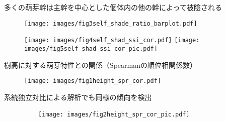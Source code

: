 \documentclass[a0, 36pt, plainboxedsections]{sciposter} %
\renewcommand{\baselinestretch}{1.2}
\begin{document}
\begin{multicols}{2}
多くの萌芽幹は主幹を中心とした個体内の他の幹によって被陰される

\begin{figure}
	\centering
		\texttt{[image: images/fig3self\_shade\_ratio\_barplot.pdf]}
				
		\texttt{[image: images/fig4self\_shad\_ssi\_cor.pdf]}
		\texttt{[image: images/fig5self\_shad\_ssi\_cor\_pic.pdf]}
\end{figure}

\columnbreak
\renewcommand{\baselinestretch}{0.8}
\begin{mdframed}[style=subsection.frame]
  \huge\textbf{}
\end{mdframed}
\renewcommand{\baselinestretch}{1.2} %

樹高に対する萌芽特性との関係（Spearmanの順位相関係数）

\begin{figure}
	\centering
		\texttt{[image: images/fig1height\_spr\_cor.pdf]}
\end{figure}

系統独立対比による解析でも同様の傾向を検出

\begin{figure}
	\centering
	　　\texttt{[image: images/fig2height\_spr\_cor\_pic.pdf]}
\end{figure}

\end{multicols}
\begin{mdframed}[style=section.frame]
  \centering\huge\textbf{}
\end{mdframed}
\end{document}
